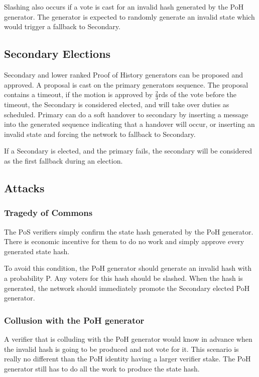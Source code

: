 \documentclass[12pt]{article}
\begin{document}
Slashing also occurs if a vote is cast for an invalid hash generated by the PoH generator. The generator is expected to randomly generate an invalid state which would trigger a fallback to Secondary.
\subsection{Secondary Elections}
Secondary and lower ranked Proof of History generators can be proposed and approved. A proposal is cast on the primary generators sequence. The proposal contains a timeout, if the motion is approved by \(\frac{2}{3}\)rds of the vote before the timeout, the Secondary is considered elected, and will take over duties as scheduled. Primary can do a soft handover to secondary by inserting a message into the generated sequence indicating that a handover will occur, or inserting an invalid state and forcing the network to fallback to Secondary.

If a Secondary is elected, and the primary fails, the secondary will be considered as the first fallback during an election.

\subsection{Attacks}
\subsubsection{Tragedy of Commons}

The PoS verifiers simply confirm the state hash generated by the PoH generator. There is economic incentive for them to do no work and simply approve every generated state hash. 

To avoid this condition, the PoH generator should generate an invalid hash with a probability P. Any voters for this hash should be slashed. When the hash is generated, the network should immediately promote the Secondary elected PoH generator.

\subsubsection{Collusion with the PoH generator}\label{subsubsec:collusion}
A verifier that is colluding with the PoH generator would know in advance when the invalid hash is going to be produced and not vote for it. This scenario is really no different than the PoH identity having a larger verifier stake. The PoH generator still has to do all the work to produce the state hash.
\end{document}
